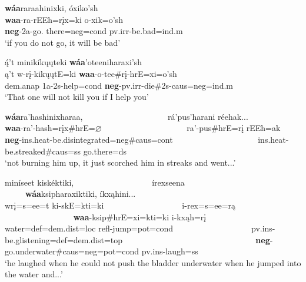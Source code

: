 \begin{exe}
\begin{xlist}
	\item\label{waanegation5}
	\glll \textbf{wáa}raraahinixki, óxiko'sh\\
	\textbf{waa}-ra-rEEh=rįx=ki o-xik=o'sh\\
	\textbf{neg}-2a-\textnormal{go. there}=neg=cond pv.irr-\textnormal{be.bad}=ind.m\\
	\glt `if you do not go, it will be bad' \citep[113]{hollow1973a}
	
	\item\label{waanegation6}
	\glll ą́'t minikíkųųteki \textbf{wáa}'oteeniharaxi'sh\\
	ą't w-rį-kikųųtE=ki \textbf{waa}-o-tee\#rį-hrE=xi=o'sh\\
	dem.anap 1a-2s-\textnormal{help}=cond \textbf{neg}-pv.irr-\textnormal{die}\#2s-caus=neg=ind.m\\
	\glt `That one will not kill you if I help you' \citep[113]{hollow1973a}
	
	\item\label{waanegation7}
	\glll \textbf{wáa}ra'hashinixharaa, ~ ~ ~ ~ ~ ~ ~ ~ ~ ~ ~ ~ rá'pus'harani réehak...\\
	\textbf{waa}-ra'-hash=rįx\#hrE=$\varnothing$ ~ ~ ~ ~ ~ ~ ~ ~ ~ ~ ~ ~  ra'-pus\#hrE=rį rEEh=ak\\
	\textbf{neg}-ins.heat-\textnormal{be.disintegrated}=neg\#caus=cont ~ ~ ~ ~ ~ ~ ~ ~ ~ ~ ~ ~ ins.heat-\textnormal{be.streaked}\#caus=ss \textnormal{go.there}=ds\\
	\glt `not burning him up, it just scorched him in streaks and went...' \citep[154]{hollow1973a}
	
	\item\label{waanegation8}
	\glll miníseet kiskéktiki, ~ ~ ~ ~ ~ ~ ~ ~ ~ ~ ~ írexseena ~ ~ ~ ~ ~ ~ ~ ~ ~ ~ ~ ~ ~ ~ ~ ~ ~ ~ ~ \textbf{wáa}ksipharaxiktiki, íkxąhini...\\
	wrį=s=ee=t ki-skE=kti=ki ~ ~ ~ ~ ~ ~ ~ ~ ~ ~ ~  i-rex=s=ee=rą ~ ~ ~ ~ ~ ~ ~ ~ ~ ~ ~ ~ ~ ~ ~ ~ ~ ~ ~ \textbf{waa}-ksip\#hrE=xi=kti=ki i-kxąh=rį\\
	\textnormal{water}=def=dem.dist=loc refl-\textnormal{jump}=pot=cond ~ ~ ~ ~ ~ ~ ~ ~ ~ ~ ~  pv.ins-\textnormal{be.glistening}=def=dem.dist=top ~ ~ ~ ~ ~ ~ ~ ~ ~ ~ ~ ~ ~ ~ ~ ~ ~ ~ ~  \textbf{neg}-\textnormal{go.underwater}\#caus=neg=pot=cond pv.ins-\textnormal{laugh}=ss\\
	\glt `he laughed when he could not push the bladder underwater when he jumped into the water and...' \citep[164]{hollow1973a}
	

\end{xlist}
\end{exe}
